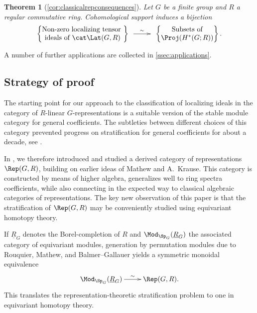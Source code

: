 \documentclass{amsart}%
\numberwithin{equation}{section}%
\newtheorem{thmx}{Theorem}
\theoremstyle{remark}
\begin{document}
\begin{thmx}[\cref{cor:classicalrepconsequences}]
Let $G$ be a finite group and $R$ a regular commutative ring. Cohomological support induces a bijection 
\[
\begin{Bmatrix}
\text{Non-zero localizing tensor } \\
\text{ideals of } \cat \Lat(G,R)
\end{Bmatrix} 
\xymatrix@C=2pc{ \ar[r]^-{\sim} &}
\begin{Bmatrix}
\text{Subsets of}  \\
\Proj(H^*(G;R))
\end{Bmatrix}.
\]
\end{thmx}

A number of further applications are collected in \cref{ssec:applications}.

\subsection{Strategy of proof}

The starting point for our approach to the classification of localizing ideals in the category of $R$-linear $G$-representations is a suitable version of the stable module category for general coefficients. The subtleties between different choices of this category prevented progress on stratification for general coefficients for about a decade, see \cite{BensonIyengarKrause13}. 

In \cite{barthel_integral1}, we therefore introduced and studied a derived category of representations $\Rep(G,R)$, building on earlier ideas of Mathew and A.~Krause. This category is constructed by means of higher algebra, generalizes well to ring spectra coefficients, while also connecting in the expected way to classical algebraic categories of representations. The key new observation of this paper is that the stratification of  $\Rep(G,R)$ may be conveniently studied using equivariant homotopy theory. 

If $\underline{R}_G$ denotes the Borel-completion of $R$ and $\Mod_{\Sp_G}(\underline{R}_G)$ the associated category of equivariant modules, generation by permutation modules due to Rouquier, Mathew, and Balmer--Gallauer yields a symmetric monoidal equivalence
\[
\xymatrix{\Mod_{\Sp_G}(\underline{R}_G) \ar[r]^-{\sim} & \Rep(G,R).}
\]
This translates the representation-theoretic stratification problem to one in equivariant homotopy theory. %
\end{document}
